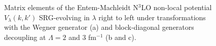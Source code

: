 \documentclass[preprintnumbers,floatfix,aps,prc,preprint,nofootinbib]{revtex4-1}
\begin{document}
\begin{figure}[H]
	\centering
	

	\caption{Matrix elements of the Entem-Machleidt N$^3$LO non-local potential $V_{\lambda}(k, k')$ SRG-evolving in $\lambda$ right to left under transformations with the Wegner generator (a) and block-diagonal generators decoupling at $\Lambda=2$ and $3$ fm$^{-1}$ (b and c).}
	\label{potential_contours_kvnn10_3S1}
\end{figure}
\end{document}
